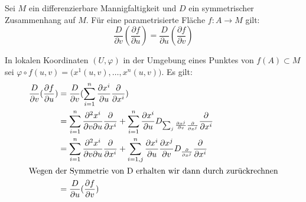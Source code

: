\documentclass[a4paper,twoside,DIV15,BCOR12mm]{scrbook}
\begin{document}
\begin{lemma}[Symmetrie]
\label{flaechsymm} Sei $M$ ein differenzierbare Mannigfaltigkeit und $D$ ein symmetrischer Zusammenhang auf $M$. Für eine parametrisierte Fläche $f: A \to M$ gilt:
\[
\frac D {\partial v} (\frac {\partial f}{\partial u}) =
\frac D {\partial u} (\frac {\partial f}{\partial v})
\]
\end{lemma}

\begin{beweis}
In lokalen Koordinaten $(U,\varphi)$ in der Umgebung eines Punktes von $f(A)\subset M$ sei $\varphi\circ f(u,v) = \big(x^1(u,v), \ldots, x^n(u,v)\big)$. Es gilt:
\begin{align*}
\frac D {\partial v} (\frac {\partial f}{\partial u}) &= \frac D{\partial v} (\sum_{i=1}^n \frac {\partial x^i}{\partial u} \frac{\partial}{\partial x^i}) \\
&= \sum_{i=1}^n \frac {\partial^2 x^i}{\partial v\partial u} \frac{\partial}{\partial x^i} + \sum_{i=1}^n \frac{\partial x^i}{\partial u} D_{\sum_j \frac{\partial x^j}{\partial v}\frac{\partial}{\partial x^j}} \frac \partial {\partial x^i} \\
&= \sum_{i=1}^n \frac {\partial^2 x^i}{\partial v\partial u} \frac{\partial}{\partial x^i} + \sum_{i=1,j}^n \frac{\partial x^i}{\partial u}\frac{\partial x^j}{\partial v}  D_{\frac{\partial}{\partial x^j}} \frac \partial {\partial x^i} \\
\intertext{Wegen der Symmetrie von D erhalten wir dann durch zurückrechnen}
&= \frac D {\partial u} (\frac {\partial f}{\partial v})
\end{align*}
\end{beweis}
\end{document}
